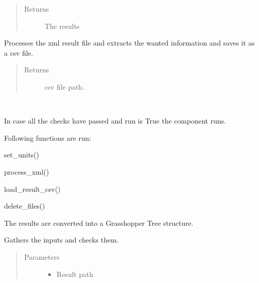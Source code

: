 \documentclass[letterpaper,10pt,english]{sphinxmanual}
\begin{document}
\begin{fulllineitems}
\begin{fulllineitems}
\begin{quote}
\begin{description}
\item[{Returns}] \leavevmode
The results

\end{description}\end{quote}

\end{fulllineitems}


\begin{fulllineitems}
\label{\detokenize{cmf:livestock.components.comp_cmf.CMFResults.process_xml}}
Processes the xml result file and extracts the wanted information and saves it as a csv file.
\begin{quote}\begin{description}
\item[{Returns}] \leavevmode
csv file path.

\end{description}\end{quote}

\end{fulllineitems}


\begin{fulllineitems}
\label{\detokenize{cmf:livestock.components.comp_cmf.CMFResults.run}}~
\begin{DUlineblock}{0em}
\item[] In case all the checks have passed and run is True the component runs.
\item[] Following functions are run:
\item[] set\_units()
\item[] process\_xml()
\item[] load\_result\_csv()
\item[] delete\_files()
\item[] The results are converted into a Grasshopper Tree structure.
\end{DUlineblock}

\end{fulllineitems}


\begin{fulllineitems}
\label{\detokenize{cmf:livestock.components.comp_cmf.CMFResults.run_checks}}
Gathers the inputs and checks them.
\begin{quote}\begin{description}
\item[{Parameters}] \leavevmode\begin{itemize}
\item {} 
 \textendash{} Result path


\end{itemize}
\end{description}
\end{quote}
\end{fulllineitems}
\end{fulllineitems}
\end{document}

